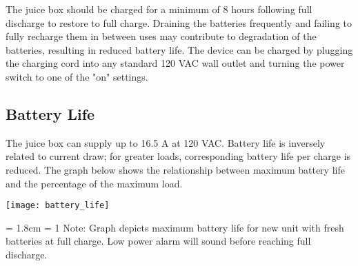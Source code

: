 \documentclass[../jb_user_manual.tex]{subfiles}
\begin{document}
The juice box should be charged for a minimum of 8 hours following full discharge to restore to full charge.  Draining the batteries frequently and failing to fully recharge them in between uses may contribute to degradation of the batteries, resulting in reduced battery life.  The device can be charged by plugging the charging cord into any standard 120 VAC wall outlet and turning the power switch to one of the "on" settings.

\subsection{\Large{Battery Life}}

The juice box can supply up to 16.5 A at 120 VAC.  Battery life is inversely related to current draw; for greater loads, corresponding battery life per charge is reduced.  The graph below shows the relationship between maximum battery life and the percentage of the maximum load.

\vspace{3mm}
\texttt{[image: battery\_life]}
\vspace{3mm}

\hangindent = 1.8cm
\hangafter = 1
Note: Graph depicts maximum battery life for new unit with fresh batteries at full charge.  Low power alarm will sound before reaching full discharge.
\end{document}
